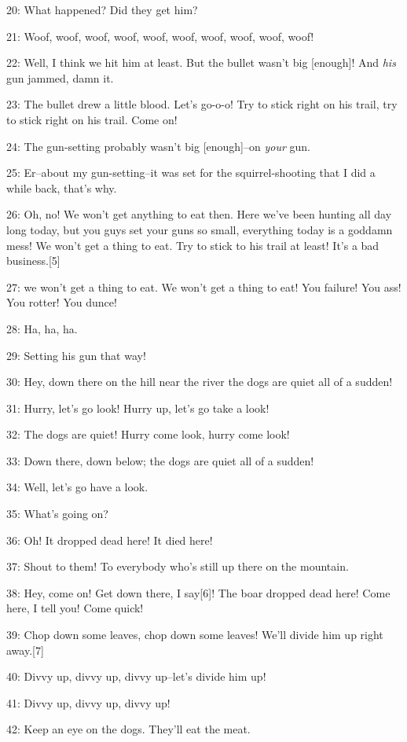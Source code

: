 20: What happened? Did they get him?

21:  Woof, woof, woof, woof, woof, woof, woof, woof, woof, woof!

22: Well, I think we hit him at least. But the bullet wasn't big [enough]! And
\textit{his} gun jammed, damn it.

23: The bullet drew a little blood. Let's go-o-o! Try to stick right on his trail,
try to stick right on his trail. Come on!

24: The gun-setting probably wasn't big [enough]--on \textit{your} gun.

25: Er--about my gun-setting--it was set for the squirrel-shooting that I did a
while back, that's why.

26: Oh, no! We won't get anything to eat then. Here we've been hunting all day
long today, but you guys set your guns so small, everything today is a goddamn
mess! We won't get a thing to eat. Try to stick to his trail at least! It's a bad
business.[5]

27: we won't get a thing to eat. We won't get a thing to eat! You failure! You
ass! You rotter! You dunce!

28: Ha, ha, ha.

29: Setting his gun that way!

30: Hey, down there on the hill near the river the dogs are quiet all of a sudden!

31: Hurry, let's go look! Hurry up, let's go take a look!

32: The dogs are quiet! Hurry come look, hurry come look!

33: Down there, down below; the dogs are quiet all of a sudden!

34: Well, let's go have a look.

35: What's going on?

36: Oh! It dropped dead here! It died here!

37: Shout to them! To everybody who's still up there on the mountain.

38: Hey, come on! Get down there, I say[6]! The boar dropped dead here! Come here,
I tell you! Come quick!

39: Chop down some leaves, chop down some leaves! We'll divide him up right away.[7]

40: Divvy up, divvy up, divvy up--let's divide him up!

41: Divvy up, divvy up, divvy up!

42: Keep an eye on the dogs. They'll eat the meat.

